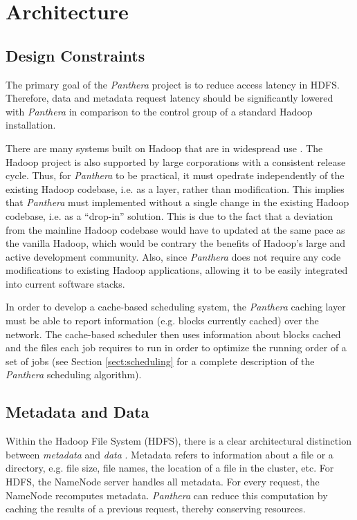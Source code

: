 \documentclass[12pt]{article}
\begin{document}
\section{Architecture} \label{sect:architecture}
\subsection{Design Constraints}  \label{design_constraints}
The primary goal of the \textit{Panthera} project is to reduce access latency in HDFS. Therefore, data and metadata request latency should be significantly lowered with \textit{Panthera} in comparison to the control group of a standard Hadoop installation. 

There are many systems built on Hadoop that are in widespread use \cite{hbase, cloudbatch, pig}. The Hadoop project is also supported by large corporations with a 
consistent release cycle. Thus, for \textit{Panthera} to be practical, it must opedrate independently of the existing Hadoop codebase, i.e. as a layer, rather than modification. This implies that \textit{Panthera} must implemented without a single change in the existing Hadoop codebase, i.e. as a ``drop-in'' solution. This is due to the fact that a deviation from the mainline Hadoop codebase would have to updated at the same pace as the vanilla Hadoop, which would be contrary the benefits of Hadoop's large and active development community.  Also, since \textit{Panthera} does not require any code modifications to existing Hadoop applications, allowing it to be easily integrated into current software stacks. 

In order to develop a cache-based scheduling system, the \textit{Panthera} caching layer must be able to report information (e.g. blocks currently cached) over the network. The cache-based scheduler then uses information about blocks cached and the files each job requires to run in order to optimize the running order of a set of jobs (see Section \ref{sect:scheduling} for a complete description of the \textit{Panthera} scheduling algorithm).

\subsection{Metadata and Data} \label{metadata_and_data}

Within the Hadoop File System (HDFS), there is a clear architectural distinction between \textit{metadata} and \textit{data} \cite{hdfs}. Metadata refers to information about a file or a directory, e.g. file size, file names, the location of a file in the cluster, etc. For HDFS, the NameNode server handles all metadata. For every request, the NameNode recomputes metadata. \textit{Panthera} can reduce this computation by caching the results of a previous request, thereby conserving resources.
\end{document}
